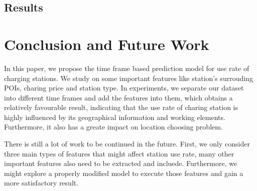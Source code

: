 \documentclass[conference]{IEEEtran}
\begin{document}
\subsection{Results}


\section{Conclusion and Future Work}
In this paper, we propose the time frame based prediction model for use rate of charging stations. We study on some important features like station's surrouding POIs, charing price and station type. In experiments, we separate our dataset into different time frames and add the features into them, which obtains a relatively favourable result, indicating that the use rate of charing station is highly influenced by its geographical information and working elements. Furthermore, it also has a greate impact on location choosing problem.

There is still a lot of work to be continued in the future. First, we only consider three main types of features that might affect station use rate, many other important features also need to be extracted and incluede. Furthermore, we might explore a properly modified model to execute those features and gain a more satisfactory result.




\end{document}
